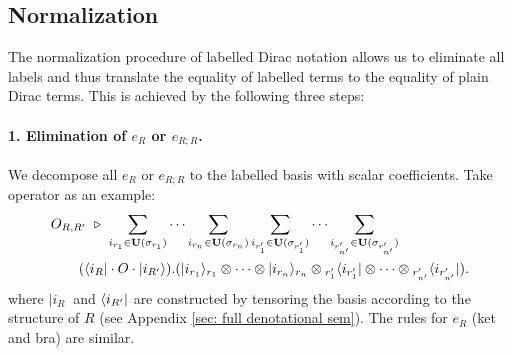 \subsection{Normalization}
The normalization procedure of labelled Dirac notation allows us to eliminate all labels and thus translate the equality of labelled terms to the equality of plain Dirac terms. This is achieved by the following three steps: 

\paragraph*{1. Elimination of $e_R$ or $e_{R;R}$.}
We decompose all $e_R$ or $e_{R;R}$ to the labelled basis with scalar coefficients. 
Take operator as an example:
\begin{align*}
    & O_{R,R'} \ \triangleright\ \sum_{i_{r_1}\in\mathbf{U}(\sigma_{r_1})}\cdots \sum_{i_{r_n}\in\mathbf{U}(\sigma_{r_n})}
    \sum_{i_{r'_1}\in\mathbf{U}(\sigma_{r'_1})}\cdots \sum_{i_{r'_{n'}}\in\mathbf{U}(\sigma_{r'_{n'}})} \\
    & \qquad (\langle i_R|\cdot O\cdot |i_{R'}\rangle).(|i_{r_1}\rangle_{r_1}\otimes\cdots\otimes|i_{r_n}\rangle_{r_n} \otimes {}_{r'_1}\langle i_{r'_1}|\otimes\cdots\otimes{}_{r'_{n'}}\langle i_{r'_{n'}}|).
\end{align*}
where $|i_R\>$ and $\langle i_{R'}|$ are constructed by tensoring the basis according to the structure of $R$ (see Appendix \ref{sec: full denotational sem}). The rules for $e_R$ (ket and bra) are similar.

